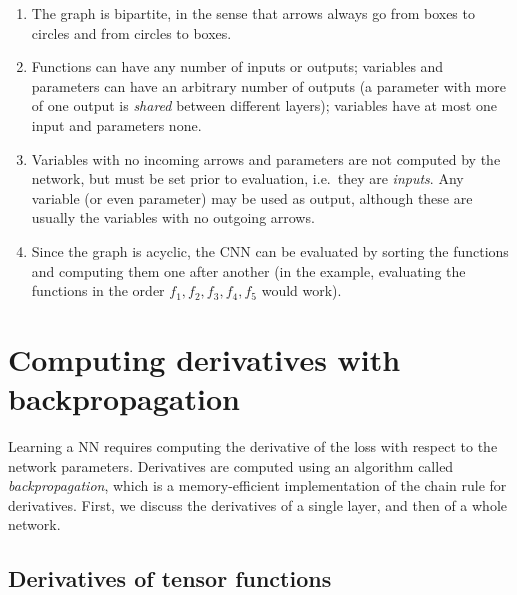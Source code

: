 \begin{enumerate}
\item The graph is bipartite, in the sense that arrows always go from boxes to circles and from circles to boxes. 
\item Functions can have any number of inputs or outputs; variables and parameters can have an arbitrary number of outputs (a parameter with more of one output is \emph{shared} between different layers); variables have at most one input and parameters none. 
\item Variables with no incoming arrows and parameters are not computed by the network, but must be set prior to evaluation, i.e.\ they are \emph{inputs}. Any variable (or even parameter) may be used as output, although these are usually the variables with no outgoing arrows.
\item Since the graph is acyclic, the CNN can be evaluated by sorting the functions and computing them one after another (in the example, evaluating the functions in the order $f_1,f_2,f_3,f_4,f_5$ would work).
\end{enumerate}

\section{Computing derivatives with backpropagation}\label{s:back}

Learning a NN requires computing the derivative of the loss with respect to the network parameters. Derivatives are computed using an algorithm called \emph{backpropagation}, which is a memory-efficient implementation of the chain rule for derivatives. First, we discuss the derivatives of a single layer, and then of a whole network.

\subsection{Derivatives of tensor functions}

